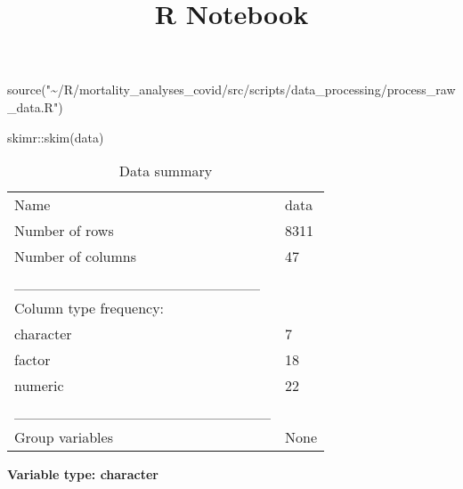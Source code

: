 \documentclass[
]{article}
\title{R Notebook}
\author{}
\date{\vspace{-2.5em}}
\newenvironment{Shaded}{\begin{snugshade}}{\end{snugshade}}
\newcommand{\FunctionTok}[1]{\textcolor[rgb]{0.00,0.00,0.00}{#1}}
\newcommand{\NormalTok}[1]{#1}
\newcommand{\SpecialCharTok}[1]{\textcolor[rgb]{0.00,0.00,0.00}{#1}}
\newcommand{\StringTok}[1]{\textcolor[rgb]{0.31,0.60,0.02}{#1}}
\begin{document}
\maketitle

\begin{Shaded}
\begin{Highlighting}[]
\FunctionTok{source}\NormalTok{(}\StringTok{"\textasciitilde{}/R/mortality\_analyses\_covid/src/scripts/data\_processing/process\_raw\_data.R"}\NormalTok{)}
\end{Highlighting}
\end{Shaded}

\begin{Shaded}
\begin{Highlighting}[]
\NormalTok{skimr}\SpecialCharTok{::}\FunctionTok{skim}\NormalTok{(data)}
\end{Highlighting}
\end{Shaded}

\begin{longtable}[]{@{}ll@{}}
\caption{Data summary}\tabularnewline
\toprule()
\endhead
Name & data \\
Number of rows & 8311 \\
Number of columns & 47 \\
\_\_\_\_\_\_\_\_\_\_\_\_\_\_\_\_\_\_\_\_\_\_\_ & \\
Column type frequency: & \\
character & 7 \\
factor & 18 \\
numeric & 22 \\
\_\_\_\_\_\_\_\_\_\_\_\_\_\_\_\_\_\_\_\_\_\_\_\_ & \\
Group variables & None \\
\bottomrule()
\end{longtable}

\textbf{Variable type: character}
\end{document}
